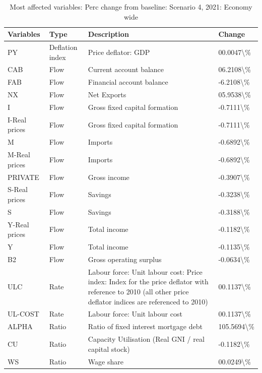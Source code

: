\documentclass[
]{book}
\begin{document}
\begin{table}

\caption{\label{tab:most-affected-Scenario-4-perc-economy}Most affected variables: Perc change from baseline: Scenario 4, 2021: Economy wide}
\centering
\fontsize{10}{12}\selectfont
\begin{tabular}[t]{l|l|l|l}
\hline
Variables & Type & Description & Change\\
\hline
PY & Deflation index & Price deflator: GDP & 00.0047\textbackslash{}\%\\
\hline
CAB & Flow & Current account balance & 06.2108\textbackslash{}\%\\
\hline
FAB & Flow & Financial account balance & -6.2108\textbackslash{}\%\\
\hline
NX & Flow & Net Exports & 05.9538\textbackslash{}\%\\
\hline
I & Flow & Gross fixed capital formation & -0.7111\textbackslash{}\%\\
\hline
I-Real prices & Flow & Gross fixed capital formation & -0.7111\textbackslash{}\%\\
\hline
M & Flow & Imports & -0.6892\textbackslash{}\%\\
\hline
M-Real prices & Flow & Imports & -0.6892\textbackslash{}\%\\
\hline
PRIVATE & Flow & Gross income & -0.3907\textbackslash{}\%\\
\hline
S-Real prices & Flow & Savings & -0.3238\textbackslash{}\%\\
\hline
S & Flow & Savings & -0.3188\textbackslash{}\%\\
\hline
Y-Real prices & Flow & Total income & -0.1182\textbackslash{}\%\\
\hline
Y & Flow & Total income & -0.1135\textbackslash{}\%\\
\hline
B2 & Flow & Gross operating surplus & -0.0634\textbackslash{}\%\\
\hline
ULC & Rate & Labour force: Unit labour cost: Price index: Index for the price deflator with reference to 2010 (all other price deflator indices are referenced to 2010) & 00.1137\textbackslash{}\%\\
\hline
UL-COST & Rate & Labour force: Unit labour cost & 00.1137\textbackslash{}\%\\
\hline
ALPHA & Ratio & Ratio of fixed interest mortgage debt & 105.5694\textbackslash{}\%\\
\hline
CU & Ratio & Capacity Utilisation (Real GNI  /  real capital stock) & -0.1182\textbackslash{}\%\\
\hline
WS & Ratio & Wage share & 00.0249\textbackslash{}\%\\
\hline
\end{tabular}
\end{table}
\end{document}
